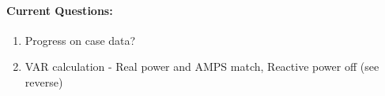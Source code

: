 \documentclass[12pt]{article}
\begin{document}
\begin{multicols}{2}




	\paragraph{Current Questions:}
	\begin{enumerate}
\itemsep0em 
	\item Progress on case data?
	\item VAR calculation - Real power and AMPS match, Reactive power off (see reverse)
	\end{enumerate}
	



\begin{comment}
\paragraph{Future Tasks:} %
	\begin{enumerate}
		
		\item Add import mirror / bypass mirror init sequence option to prevent repeated mirror creations.

		\item Bring wind into simulation \\ (ramp ungoverned generators?)


		
	\end{enumerate}
\paragraph{Future Work: (not by me)}
\begin{itemize}
\item Find best/correct way to trip gens in PSLF from python.
\item Account for different types of loads better. (exponential load model) %
\item Work to incorporate Matt's \emph{Suggested Use Cases} into simulation.
		\begin{itemize}
		\item Add Shunt Group Agent
		\item Work to Define Definite Time Controller user input
		\end{itemize} 



\end{comment}
\end{multicols}
\end{document}

